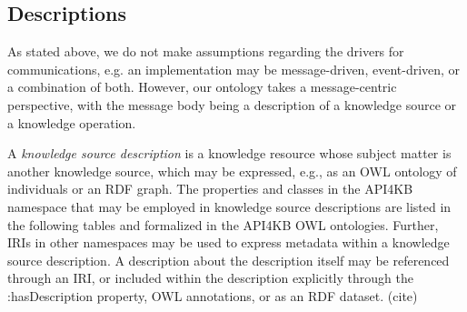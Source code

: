 \documentclass[runningheads]{llncs}
\begin{document}



\subsection{Descriptions}
As stated above, we do not make assumptions regarding the drivers for communications, e.g. an implementation may be message-driven, event-driven, or a combination of both. However, our ontology takes a message-centric perspective, with the message body being a description of a knowledge source or a knowledge operation.

A \emph{knowledge source description} is a knowledge resource whose subject matter is another knowledge source, which may be expressed, e.g., as an OWL ontology of individuals or an RDF graph. The properties and classes in the API4KB namespace that may be employed in knowledge source descriptions are listed in the following tables and formalized in the API4KB OWL ontologies. Further, IRIs in other namespaces may be used to express metadata within a knowledge source description. A description about the description itself may be referenced through an IRI, or included within the description explicitly through the :hasDescription property,  OWL annotations, or as an RDF dataset. (cite)
\end{document}
